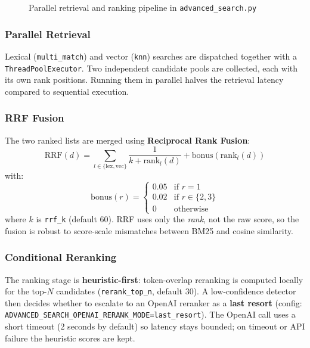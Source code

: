 \begin{figure}[H]
\caption{Parallel retrieval and ranking pipeline in \texttt{advanced\_search.py}}
\label{fig:advanced_search_ranking}
\end{figure}

\subsubsection{Parallel Retrieval}

Lexical (\texttt{multi\_match}) and vector (\texttt{knn}) searches are dispatched together with a
\texttt{ThreadPoolExecutor}. Two independent candidate pools are collected, each with its own
rank positions. Running them in parallel halves the retrieval latency compared to sequential
execution.

\subsubsection{RRF Fusion}

The two ranked lists are merged using \textbf{Reciprocal Rank Fusion}:
\begin{equation}
\mathrm{RRF}(d)=\sum_{l \in \{\mathrm{lex},\mathrm{vec}\}} \frac{1}{k+\mathrm{rank}_l(d)} + \mathrm{bonus}(\mathrm{rank}_l(d))
\label{eq:rrf}
\end{equation}
with:
\[
\mathrm{bonus}(r)=
\begin{cases}
0.05 & \text{if } r=1\\
0.02 & \text{if } r\in\{2,3\}\\
0 & \text{otherwise}
\end{cases}
\]
where $k$ is \texttt{rrf\_k} (default 60). RRF
uses only the \textit{rank}, not the raw score, so the fusion is robust to score-scale mismatches
between BM25 and cosine similarity.

\subsubsection{Conditional Reranking}

The ranking stage is \textbf{heuristic-first}: token-overlap reranking is computed locally for the
top-$N$ candidates (\texttt{rerank\_top\_n}, default 30). A low-confidence detector then decides
whether to escalate to an OpenAI reranker as a \textbf{last resort} (config:
\texttt{ADVANCED\_SEARCH\_OPENAI\_RERANK\_MODE=last\_resort}). The OpenAI call uses a short timeout
(2 seconds by default) so latency stays bounded; on timeout or API failure the heuristic scores are
kept.

